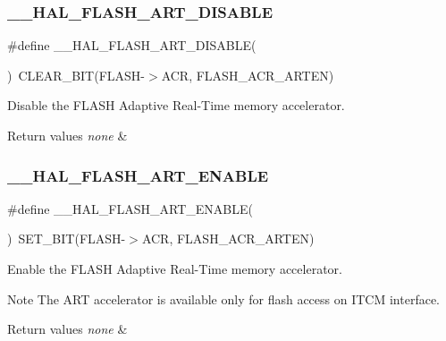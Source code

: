 \subsubsection{\texorpdfstring{\_\_HAL\_FLASH\_ART\_DISABLE}{\_\_HAL\_FLASH\_ART\_DISABLE}}
{\footnotesize\ttfamily \#define \+\_\+\+\_\+\+H\+A\+L\+\_\+\+F\+L\+A\+S\+H\+\_\+\+A\+R\+T\+\_\+\+D\+I\+S\+A\+B\+LE(\begin{DoxyParamCaption}{ }\end{DoxyParamCaption})~C\+L\+E\+A\+R\+\_\+\+B\+IT(F\+L\+A\+SH-\/$>$A\+CR, F\+L\+A\+S\+H\+\_\+\+A\+C\+R\+\_\+\+A\+R\+T\+EN)}



Disable the F\+L\+A\+SH Adaptive Real-\/\+Time memory accelerator. 


\begin{DoxyRetVals}{Return values}
{\em none} & \\
\hline
\end{DoxyRetVals}
\mbox{\label{group___f_l_a_s_h___exported___macros_ga7e6732b18da40e812f8752a01bb90ba8}} 
\subsubsection{\texorpdfstring{\_\_HAL\_FLASH\_ART\_ENABLE}{\_\_HAL\_FLASH\_ART\_ENABLE}}
{\footnotesize\ttfamily \#define \+\_\+\+\_\+\+H\+A\+L\+\_\+\+F\+L\+A\+S\+H\+\_\+\+A\+R\+T\+\_\+\+E\+N\+A\+B\+LE(\begin{DoxyParamCaption}{ }\end{DoxyParamCaption})~S\+E\+T\+\_\+\+B\+IT(F\+L\+A\+SH-\/$>$A\+CR, F\+L\+A\+S\+H\+\_\+\+A\+C\+R\+\_\+\+A\+R\+T\+EN)}



Enable the F\+L\+A\+SH Adaptive Real-\/\+Time memory accelerator. 

\begin{DoxyNote}{Note}
The A\+RT accelerator is available only for flash access on I\+T\+CM interface. 
\end{DoxyNote}

\begin{DoxyRetVals}{Return values}
{\em none} & \\
\hline
\end{DoxyRetVals}
\mbox{\label{group___f_l_a_s_h___exported___macros_ga8e4aa25abddb55a36d78628772308577}} 
